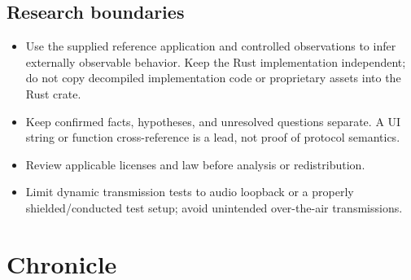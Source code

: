 \documentclass[11pt,a4paper]{article}
\begin{document}
\subsection{Research boundaries}
\begin{itemize}[leftmargin=*]
  \item Use the supplied reference application and controlled observations to
        infer externally observable behavior. Keep the Rust implementation
        independent; do not copy decompiled implementation code or proprietary
        assets into the Rust crate.
  \item Keep confirmed facts, hypotheses, and unresolved questions separate.
        A UI string or function cross-reference is a lead, not proof of
        protocol semantics.
  \item Review applicable licenses and law before analysis or redistribution.
  \item Limit dynamic transmission tests to audio loopback or a properly
        shielded/conducted test setup; avoid unintended over-the-air
        transmissions.
\end{itemize}

\section{Chronicle}
\end{document}
